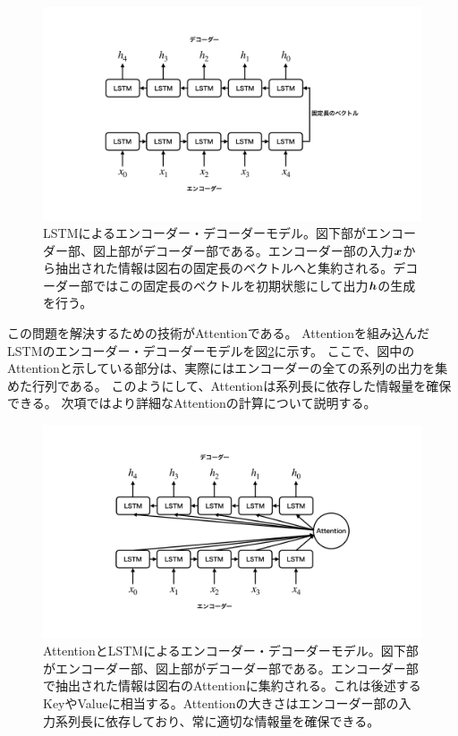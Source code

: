 \begin{figure}[htbp]
 \centering
 \includegraphics[trim = 100 100 100 200, width=1.0\textwidth, clip]{Figure/2DeepLearning/18EncoderDecoderLSTM.png}
 \caption[LSTMによるエンコーダー・デコーダーモデル]{LSTMによるエンコーダー・デコーダーモデル。図下部がエンコーダー部、図上部がデコーダー部である。エンコーダー部の入力${\mbox{\boldmath{$x$}}}$から抽出された情報は図右の固定長のベクトルへと集約される。デコーダー部ではこの固定長のベクトルを初期状態にして出力${\mbox{\boldmath{$h$}}}$の生成を行う。}
 \label{18EncoderDecoderLSTM}
\end{figure}

この問題を解決するための技術がAttentionである。
Attentionを組み込んだLSTMのエンコーダー・デコーダーモデルを図\ref{19EncoderDecoderAttention}に示す。
ここで、図中のAttentionと示している部分は、実際にはエンコーダーの全ての系列の出力を集めた行列である。
このようにして、Attentionは系列長に依存した情報量を確保できる。
次項ではより詳細なAttentionの計算について説明する。

\begin{figure}[htbp]
 \centering
 \includegraphics[trim = 100 100 100 200, width=1.0\textwidth, clip]{Figure/2DeepLearning/19EncoderDecoderAttention.png}
 \caption[AttentionとLSTMによるエンコーダー・デコーダーモデル]{AttentionとLSTMによるエンコーダー・デコーダーモデル。図下部がエンコーダー部、図上部がデコーダー部である。エンコーダー部で抽出された情報は図右のAttentionに集約される。これは後述するKeyやValueに相当する。Attentionの大きさはエンコーダー部の入力系列長に依存しており、常に適切な情報量を確保できる。}
 \label{19EncoderDecoderAttention}
\end{figure}


